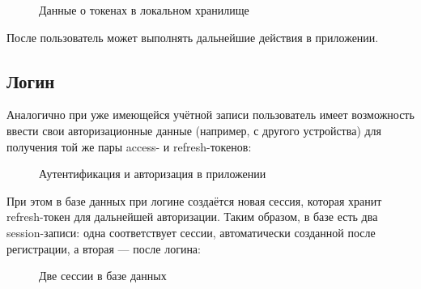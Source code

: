 \documentclass[diploma]{SCWorks}
\begin{document}
\begin{figure}[H]
	\caption{Данные о токенах в локальном хранилище}
	\label{pic:reg-localstorage}
\end{figure}

После пользователь может выполнять дальнейшие действия в приложении.

\subsection{Логин}

Аналогично при уже имеющейся учётной записи пользователь имеет возможность 
ввести свои авторизационные данные (например, с другого устройства) для 
получения той же пары access- и refresh-токенов:

\begin{figure}[H]
	\caption{Аутентификация и авторизация в приложении}
	\label{pic:login-frontend}
\end{figure}

При этом в базе данных при логине создаётся новая сессия, которая хранит 
refresh-токен для дальнейшей авторизации. Таким образом, в базе есть два
session-записи: одна соответствует сессии, автоматически созданной после
регистрации, а вторая — после логина:

\begin{figure}[H]
	\caption{Две сессии в базе данных}
	\label{pic:login-backend}
\end{figure}
\end{document}
